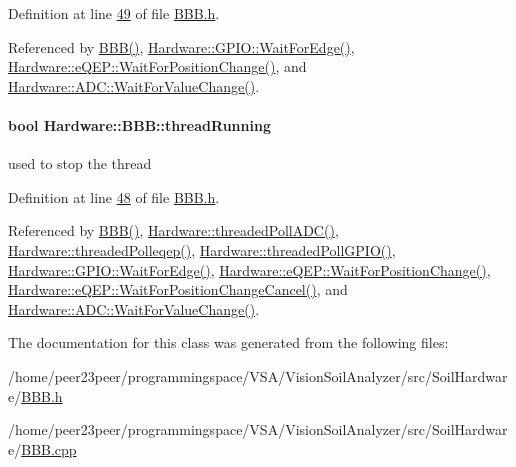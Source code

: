Definition at line \hyperlink{_b_b_b_8h_source_l00049}{49} of file \hyperlink{_b_b_b_8h_source}{B\+B\+B.\+h}.



Referenced by \hyperlink{_b_b_b_8cpp_source_l00012}{B\+B\+B()}, \hyperlink{_g_p_i_o_8cpp_source_l00026}{Hardware\+::\+G\+P\+I\+O\+::\+Wait\+For\+Edge()}, \hyperlink{eqep_8cpp_source_l00124}{Hardware\+::e\+Q\+E\+P\+::\+Wait\+For\+Position\+Change()}, and \hyperlink{_a_d_c_8cpp_source_l00074}{Hardware\+::\+A\+D\+C\+::\+Wait\+For\+Value\+Change()}.

\hypertarget{class_hardware_1_1_b_b_b_a0d9d8c56afb37955e0d0c6baf0f418df}{}
\paragraph[{thread\+Running}]{\setlength{\rightskip}{0pt plus 5cm}bool Hardware\+::\+B\+B\+B\+::thread\+Running\hspace{0.3cm}{\ttfamily [protected]}}\label{class_hardware_1_1_b_b_b_a0d9d8c56afb37955e0d0c6baf0f418df}
used to stop the thread 

Definition at line \hyperlink{_b_b_b_8h_source_l00048}{48} of file \hyperlink{_b_b_b_8h_source}{B\+B\+B.\+h}.



Referenced by \hyperlink{_b_b_b_8cpp_source_l00012}{B\+B\+B()}, \hyperlink{_a_d_c_8cpp_source_l00121}{Hardware\+::threaded\+Poll\+A\+D\+C()}, \hyperlink{eqep_8cpp_source_l00242}{Hardware\+::threaded\+Polleqep()}, \hyperlink{_g_p_i_o_8cpp_source_l00266}{Hardware\+::threaded\+Poll\+G\+P\+I\+O()}, \hyperlink{_g_p_i_o_8cpp_source_l00026}{Hardware\+::\+G\+P\+I\+O\+::\+Wait\+For\+Edge()}, \hyperlink{eqep_8cpp_source_l00124}{Hardware\+::e\+Q\+E\+P\+::\+Wait\+For\+Position\+Change()}, \hyperlink{eqep_8h_source_l00068}{Hardware\+::e\+Q\+E\+P\+::\+Wait\+For\+Position\+Change\+Cancel()}, and \hyperlink{_a_d_c_8cpp_source_l00074}{Hardware\+::\+A\+D\+C\+::\+Wait\+For\+Value\+Change()}.



The documentation for this class was generated from the following files\+:\begin{DoxyCompactItemize}
\item 
/home/peer23peer/programmingspace/\+V\+S\+A/\+Vision\+Soil\+Analyzer/src/\+Soil\+Hardware/\hyperlink{_b_b_b_8h}{B\+B\+B.\+h}\item 
/home/peer23peer/programmingspace/\+V\+S\+A/\+Vision\+Soil\+Analyzer/src/\+Soil\+Hardware/\hyperlink{_b_b_b_8cpp}{B\+B\+B.\+cpp}\end{DoxyCompactItemize}
